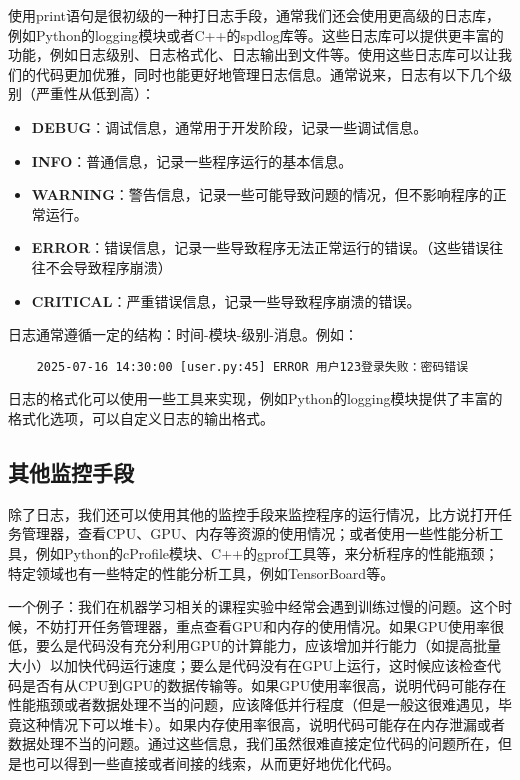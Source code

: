 使用print语句是很初级的一种打日志手段，通常我们还会使用更高级的日志库，例如Python的logging模块或者C++的spdlog库等。这些日志库可以提供更丰富的功能，例如日志级别、日志格式化、日志输出到文件等。使用这些日志库可以让我们的代码更加优雅，同时也能更好地管理日志信息。通常说来，日志有以下几个级别（严重性从低到高）：
\begin{itemize}
  \item \textbf{DEBUG}：调试信息，通常用于开发阶段，记录一些调试信息。
  \item \textbf{INFO}：普通信息，记录一些程序运行的基本信息。
  \item \textbf{WARNING}：警告信息，记录一些可能导致问题的情况，但不影响程序的正常运行。
  \item \textbf{ERROR}：错误信息，记录一些导致程序无法正常运行的错误。（这些错误往往不会导致程序崩溃）
  \item \textbf{CRITICAL}：严重错误信息，记录一些导致程序崩溃的错误。
\end{itemize}

日志通常遵循一定的结构：时间-模块-级别-消息。例如：
\begin{lstlisting}
    2025-07-16 14:30:00 [user.py:45] ERROR 用户123登录失败：密码错误
\end{lstlisting}

日志的格式化可以使用一些工具来实现，例如Python的logging模块提供了丰富的格式化选项，可以自定义日志的输出格式。

\subsection{其他监控手段}\label{subsec:other-monitoring}

除了日志，我们还可以使用其他的监控手段来监控程序的运行情况，比方说打开任务管理器，查看CPU、GPU、内存等资源的使用情况；或者使用一些性能分析工具，例如Python的cProfile模块、C++的gprof工具等，来分析程序的性能瓶颈；特定领域也有一些特定的性能分析工具，例如TensorBoard等。

一个例子：我们在机器学习相关的课程实验中经常会遇到训练过慢的问题。这个时候，不妨打开任务管理器，重点查看GPU和内存的使用情况。如果GPU使用率很低，要么是代码没有充分利用GPU的计算能力，应该增加并行能力（如提高批量大小）以加快代码运行速度；要么是代码没有在GPU上运行，这时候应该检查代码是否有从CPU到GPU的数据传输等。如果GPU使用率很高，说明代码可能存在性能瓶颈或者数据处理不当的问题，应该降低并行程度（但是一般这很难遇见，毕竟这种情况下可以堆卡）。如果内存使用率很高，说明代码可能存在内存泄漏或者数据处理不当的问题。通过这些信息，我们虽然很难直接定位代码的问题所在，但是也可以得到一些直接或者间接的线索，从而更好地优化代码。

